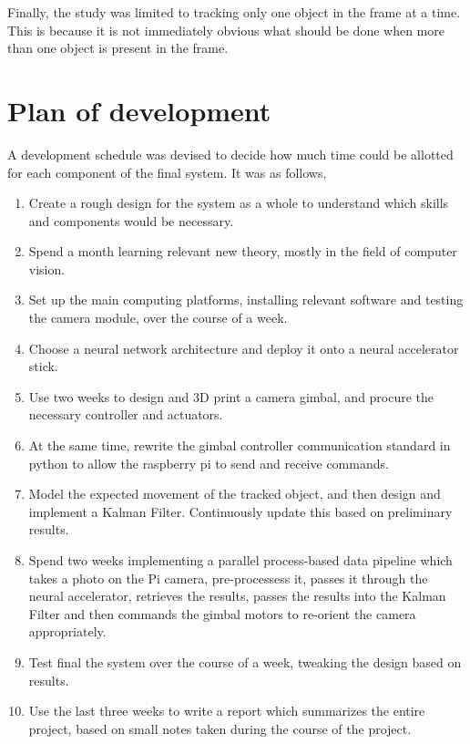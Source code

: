 
Finally, the study was limited to tracking only one object in the frame at a time. This is because it is not immediately obvious what should be done when more than one object is present in the frame.


\section{Plan of development}
A development schedule was devised to decide how much time could be allotted for each component of the final system. It was as follows,

\begin{enumerate}
\item Create a rough design for the system as a whole to understand which skills and components would be necessary.
\item Spend a month learning relevant new theory, mostly in the field of computer vision.
\item Set up the main computing platforms, installing relevant software and testing the camera module, over the course of a week.
\item Choose a neural network architecture and deploy it onto a neural accelerator stick.
\item Use two weeks to design and 3D print a camera gimbal, and procure the necessary controller and actuators.
\item At the same time, rewrite the gimbal controller communication standard in python to allow the raspberry pi to send and receive commands.
\item Model the expected movement of the tracked object, and then design and implement a Kalman Filter. Continuously update this based on preliminary results. 
\item Spend two weeks implementing a parallel process-based data pipeline which takes a photo on the Pi camera, pre-processess it, passes it through the neural accelerator, retrieves the results, passes the results into the Kalman Filter and then commands the gimbal motors to re-orient the camera appropriately. 
\item Test final the system over the course of a week, tweaking the design based on results.
\item Use the last three weeks to write a report which summarizes the entire project, based on small notes taken during the course of the project.
\end{enumerate}




